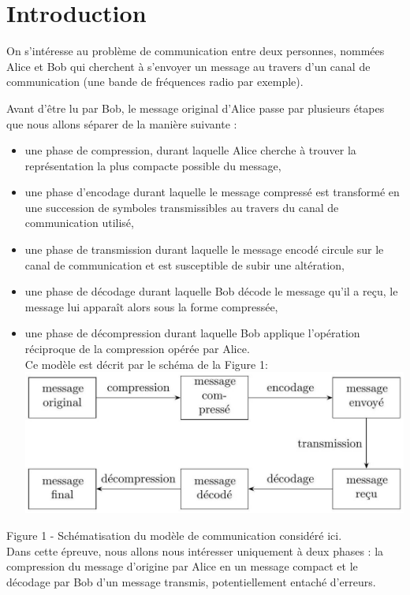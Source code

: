 \documentclass[10pt]{article}
\begin{document}
\section*{Introduction}
On s'intéresse au problème de communication entre deux personnes, nommées Alice et Bob qui cherchent à s'envoyer un message au travers d'un canal de communication (une bande de fréquences radio par exemple).

Avant d'être lu par Bob, le message original d'Alice passe par plusieurs étapes que nous allons séparer de la manière suivante :

\begin{itemize}
  \item une phase de compression, durant laquelle Alice cherche à trouver la représentation la plus compacte possible du message,
  \item une phase d'encodage durant laquelle le message compressé est transformé en une succession de symboles transmissibles au travers du canal de communication utilisé,
  \item une phase de transmission durant laquelle le message encodé circule sur le canal de communication et est susceptible de subir une altération,
  \item une phase de décodage durant laquelle Bob décode le message qu'il a reçu, le message lui apparaît alors sous la forme compressée,
  \item une phase de décompression durant laquelle Bob applique l'opération réciproque de la compression opérée par Alice.\\
Ce modèle est décrit par le schéma de la Figure 1:\\
\includegraphics[max width=\textwidth, center]{2025_04_25_b5f58c3e8cc704f29fe4g-02}
\end{itemize}

Figure 1 - Schématisation du modèle de communication considéré ici.\\
Dans cette épreuve, nous allons nous intéresser uniquement à deux phases : la compression du message d'origine par Alice en un message compact et le décodage par Bob d'un message transmis, potentiellement entaché d'erreurs.
\end{document}
